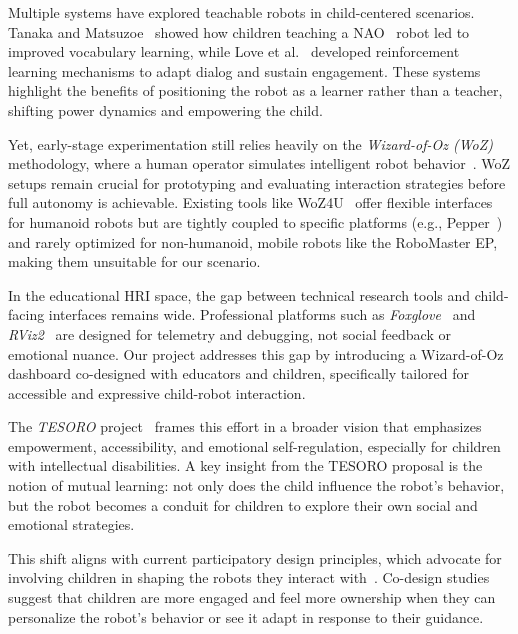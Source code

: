 \documentclass[a4paper]{usiinfbachelorproject}
\begin{document}
Multiple systems have explored teachable robots in child-centered scenarios.
Tanaka and Matsuzoe~\cite{10.5898/JHRI.1.1.Tanaka} showed how children teaching a NAO~\cite{nao_robot} robot led to improved vocabulary learning, while Love et al.~\cite{love2023adapting, love2024teachable} developed reinforcement learning mechanisms to adapt dialog and sustain engagement.
These systems highlight the benefits of positioning the robot as a learner rather than a teacher, shifting power dynamics and empowering the child.

Yet, early-stage experimentation still relies heavily on the \textit{Wizard-of-Oz (WoZ)} methodology, where a human operator simulates intelligent robot behavior~\cite{weiss2010userWOZ, rietz2021woz4uPepper, SCHOONDERWOERD2022102831}.
WoZ setups remain crucial for prototyping and evaluating interaction strategies before full autonomy is achievable.
Existing tools like WoZ4U~\cite{rietz2021woz4uPepper} offer flexible interfaces for humanoid robots but are tightly coupled to specific platforms (e.g., Pepper~\cite{pepper_robot, rietz2021woz4uPepper}) and rarely optimized for non-humanoid, mobile robots like the RoboMaster EP, making them unsuitable for our scenario.

In the educational HRI space, the gap between technical research tools and child-facing interfaces remains wide.
Professional platforms such as \textit{Foxglove}~\cite{foxglove} and \textit{RViz2}~\cite{rviz2} are designed for telemetry and debugging, not social feedback or emotional nuance.
Our project addresses this gap by introducing a Wizard-of-Oz dashboard co-designed with educators and children, specifically tailored for accessible and expressive child-robot interaction.

The \textit{TESORO} project~\cite{landoni2025tesoro} frames this effort in a broader vision that emphasizes empowerment, accessibility, and emotional self-regulation, especially for children with intellectual disabilities.
A key insight from the TESORO proposal is the notion of mutual learning: not only does the child influence the robot's behavior, but the robot becomes a conduit for children to explore their own social and emotional strategies.

This shift aligns with current participatory design principles, which advocate for involving children in shaping the robots they interact with~\cite{osti_10386132, rose2019participatory}.
Co-design studies suggest that children are more engaged and feel more ownership when they can personalize the robot's behavior or see it adapt in response to their guidance.
\end{document}
